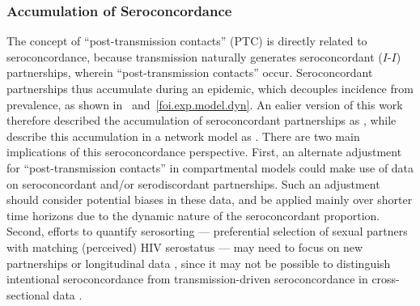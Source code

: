\subsubsection{Accumulation of Seroconcordance}
The concept of ``post-transmission contacts'' (PTC) is directly related to seroconcordance,
because transmission naturally generates seroconcordant ($I$-$I$) partnerships,
wherein ``post-transmission contacts'' occur.
Seroconcordant partnerships thus accumulate during an epidemic,
which decouples incidence from prevalence,
as shown in ~and~\ref{foi.exp.model.dyn}.
An ealier version of this work \cite{Knight2022smdm} therefore
described the accumulation of seroconcordant partnerships as
, while
\citet{Eames2002} describe this accumulation in a network model as
.
There are two main implications of this seroconcordance perspective.
First, an alternate adjustment for ``post-transmission contacts'' in compartmental models
could make use of data on seroconcordant and/or serodiscordant partnerships.
Such an adjustment should consider potential biases in these data, and
be applied mainly over shorter time horizons
due to the dynamic nature of the seroconcordant proportion.
Second, efforts to quantify serosorting --- preferential selection of sexual partners
with matching (perceived) HIV serostatus \cite{Cassels2013} ---
may need to focus on new partnerships or longitudinal data \cite{Kim2020},
since it may not be possible to distinguish intentional seroconcordance
from transmission-driven seroconcordance in cross-sectional data \cite{Cassels2009,Wang2020}.
